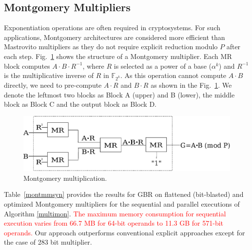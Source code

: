 \subsection{Montgomery Multipliers}{}
Exponentiation operations are often required in cryptosystems.  
For such applications, Montgomery architectures \cite{acar:1998} \cite{wu:2002}{}
\cite{Knezevic:2008} are considered more efficient than Mastrovito multipliers
as they do not require explicit reduction modulo $P$ after each step.
Fig.~\ref{montfig} shows the structure of a Montgomery
multiplier. Each MR block computes $A\cdot B\cdot R^{-1}$, where $R$
is selected as a power of a base ($\alpha^{k}$) and $R^{-1}$ is the multiplicative 
inverse of $R$ in $\mathbb{F}_{2^k}$. As this operation cannot compute $A\cdot B$
directly, we need to pre-compute $A\cdot R$ and $B\cdot R$ as shown in the Fig.~\ref{montfig}. 
We denote the leftmost
two blocks as Block A (upper) and B (lower), the middle block as Block
C and the output block as Block D.

\begin{figure}[H]
  \centering
  \includegraphics[scale=0.34]{new_mmcircuit}
  \caption{Montgomery multiplication.}
  \label{montfig}
  \end{figure}



\par Table~\ref{montmmsyn} provides the results for GBR on flattened
(bit-blasted) and  optimized Montgomery multipliers for the sequential
and parallel executions of Algorithm
\ref{multimon}. \textcolor{red}{The maximum  
memory consumption for sequential execution varies from 
66.7 MB for 64-bit operands to 11.3 GB for 571-bit operands.} 
Our approach outperforms conventional explicit approaches except for
the case of 283 bit multiplier. 

